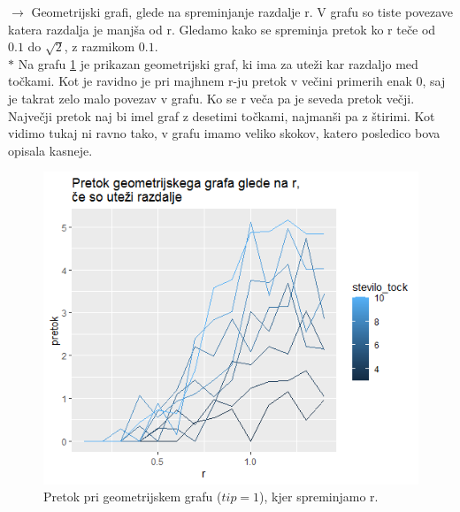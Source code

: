 \documentclass[a4paper]{article}
\begin{document}
$\rightarrow$ Geometrijski grafi, glede na spreminjanje razdalje r. V grafu so tiste povezave katera razdalja je manjša od r. Gledamo kako se spreminja pretok ko r teče od $0.1$ do $\sqrt{2}$, z razmikom $0.1$.  \\


$\ast$ Na grafu \ref{fig15} je prikazan geometrijski graf, ki ima za uteži kar razdaljo med točkami. Kot je ravidno je pri majhnem r-ju pretok v večini primerih enak 0, saj je takrat zelo malo povezav v grafu. Ko se r veča pa je seveda pretok večji. Največji pretok naj bi imel graf z desetimi točkami, najmanši pa z štirimi. Kot vidimo tukaj ni ravno tako, v grafu imamo veliko skokov, katero posledico bova opisala kasneje.
\begin{figure}[H]
\centerline{\includegraphics[scale=.6]{p10.PNG}}
\caption{Pretok pri geometrijskem grafu ($tip = 1$), kjer spreminjamo r.}
\label{fig15}
\end{figure} 
\end{document}
